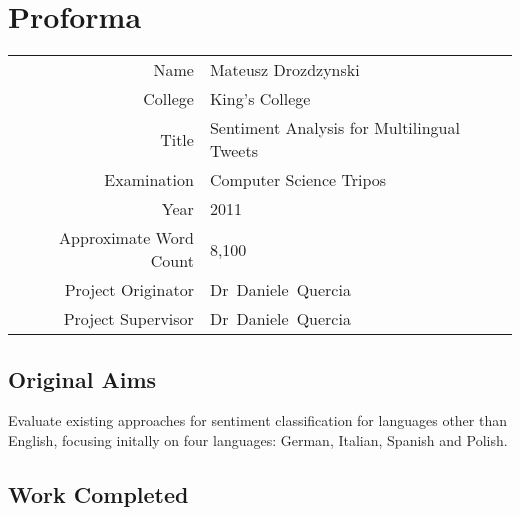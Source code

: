 \setcounter{page}{1}
\pagestyle{plain}

\chapter*{Proforma}

\begin{tabular}{ r l }

\vspace{0.1in}
{\sc Name} & Mateusz Drozdzynski \\

\vspace{0.1in}
{\sc College} & King's College \\

\vspace{0.1in}
{\sc Title} & Sentiment Analysis for Multilingual Tweets \\

\vspace{0.1in}
{\sc Examination} & Computer Science Tripos \\

\vspace{0.1in}
{\sc Year} & 2011 \\

\vspace{0.1in}
{\sc Approximate Word Count} & 8,100 \\

\vspace{0.1in}
{\sc Project Originator} & Dr~Daniele~Quercia \\

\vspace{0.1in}
{\sc Project Supervisor} & Dr~Daniele~Quercia \\

\end{tabular}

\section*{Original Aims}

Evaluate existing approaches for sentiment classification for languages other than English, focusing initally on four languages: German, Italian, Spanish and Polish.

\section*{Work Completed}

